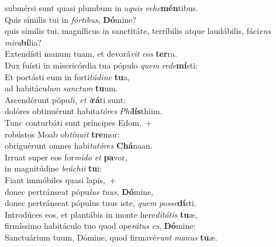\oddverse submérsi sunt quasi plumbum in a\textit{quis} \textit{ve}\textit{he}\textbf{mén}tibus.\\
\evenverse Quis símilis tui in \textit{fór}\textit{ti}\textit{bus}, \textbf{Dó}mine?~\*\\
\evenverse quis símilis tui, magníficus in sanctitáte, terríbilis atque laudábilis, fáci\textit{ens} \textit{mi}\textit{ra}\textbf{bí}lia?\\
\oddverse Extendísti manum tuam, et devorá\textit{vit} \textit{e}\textit{os} \textbf{ter}ra.~\*\\
\oddverse Dux fuísti in misericórdia tua pópulo \textit{quem} \textit{re}\textit{de}\textbf{mí}sti:\\
\evenverse Et portásti eum in forti\textit{tú}\textit{di}\textit{ne} \textbf{tu}a,~\*\\
\evenverse ad habitácu\textit{lum} \textit{san}\textit{ctum} \textbf{tu}um.\\
\oddverse Ascendérunt pópu\textit{li}, \textit{et} \textit{i}\textbf{rá}ti sunt:~\*\\
\oddverse dolóres obtinuérunt habita\textit{tó}\textit{res} \textit{Phi}\textbf{lís}thiim.\\
\evenverse Tunc conturbáti sunt príncipes Edom,~+\\
\evenverse  robústos Moab ob\textit{tí}\textit{nu}\textit{it} \textbf{tre}mor:~\*\\
\evenverse obriguérunt omnes habi\textit{ta}\textit{tó}\textit{res} \textbf{Chá}naan.\\
\oddverse Irruat super eos for\textit{mí}\textit{do} \textit{et} \textbf{pa}vor,~\*\\
\oddverse in magnitúdine \textit{brá}\textit{chi}\textit{i} \textbf{tu}i:\\
\evenverse Fiant immóbiles quasi lapis,~+\\
\evenverse  donec pertránseat pópu\textit{lus} \textit{tu}\textit{us}, \textbf{Dó}mine,~\*\\
\evenverse donec pertránseat pópulus tuus iste, \textit{quem} \textit{pos}\textit{se}\textbf{dí}sti.\\
\oddverse Introdúces eos, et plantábis in monte here\textit{di}\textit{tá}\textit{tis} \textbf{tu}æ,~\*\\
\oddverse firmíssimo habitáculo tuo quod ope\textit{rá}\textit{tus} \textit{es}, \textbf{Dó}mine:\\
\evenverse Sanctuárium tuum, Dómine, quod firmavé\textit{runt} \textit{ma}\textit{nus} \textbf{tu}æ.~\*\\
